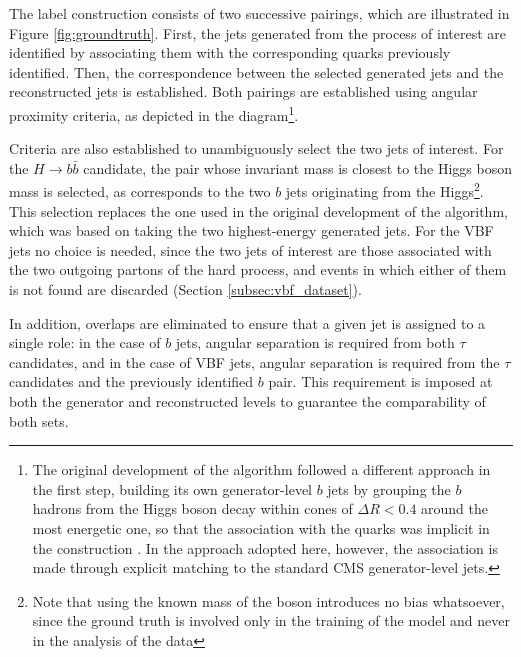 The label construction consists of two successive pairings, which are illustrated in Figure \ref{fig:groundtruth}. First, the jets generated from the process of interest are identified by associating them with the corresponding quarks previously identified. Then, the correspondence between the selected generated jets and the reconstructed jets is established. Both pairings are established using angular proximity criteria, as depicted in the diagram\footnote{The original development of the algorithm followed a different approach in the first step, building its own generator-level $b$ jets by grouping the $b$ hadrons from the Higgs boson decay within cones of $\Delta R < 0.4$ around the most energetic one, so that the association with the quarks was implicit in the construction \textcolor{red}{\cite{CMS-HIG-20-010,HHBTag}}. In the approach adopted here, however, the association is made through explicit matching to the standard CMS generator-level jets.}.

%
Criteria are also established to unambiguously select the two jets of interest. For the $H\rightarrow b\bar{b}$ candidate, the pair whose invariant mass is closest to the Higgs boson mass is selected, as corresponds to the two $b$ jets originating from the Higgs\footnote{Note that using the known mass of the boson introduces no bias whatsoever, since the ground truth is involved only in the training of the model and never in the analysis of the data}. This selection replaces the one used in the original development of the algorithm, which was based on taking the two highest-energy generated jets. For the VBF jets no choice is needed, since the two jets of interest are those associated with the two outgoing partons of the hard process, and events in which either of them is not found are discarded (Section \ref{subsec:vbf_dataset}).

In addition, overlaps are eliminated to ensure that a given jet is assigned to a single role: in the case of $b$ jets, angular separation is required from both $\tau$ candidates, and in the case of VBF jets, angular separation is required from the $\tau$ candidates and the previously identified $b$ pair. This requirement is imposed at both the generator and reconstructed levels to guarantee the comparability of both sets.


